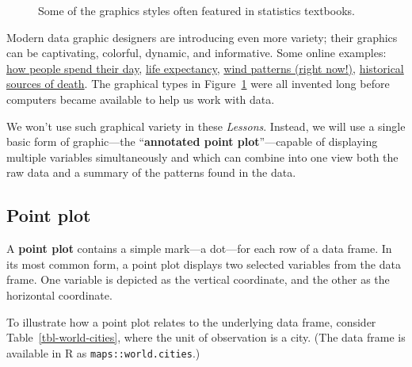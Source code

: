 \documentclass[
  letterpaper,
  DIV=11,
  numbers=noendperiod,
  oneside]{scrartcl}
\begin{document}
\begin{figure}
\begin{minipage}{0.25\linewidth}
\end{minipage}%

\caption{\label{fig-textbook-graphs}Some of the graphics styles often
featured in statistics textbooks.}

\end{figure}%

Modern data graphic designers are introducing even more variety; their
graphics can be captivating, colorful, dynamic, and informative. Some
online examples:
\href{https://flowingdata.com/2015/12/15/a-day-in-the-life-of-americans}{how
people spend their day},
\href{https://flowingdata.com/2017/01/24/one-dataset-visualized-25-ways}{life
expectancy}, \href{http://hint.fm/wind/}{wind patterns (right now!)},
\href{https://archive.nytimes.com/www.nytimes.com/imagepages/2011/11/06/opinion/06atrocities_timeline.html?action=click&contentCollection=Opinion&module=RelatedCoverage\%25C2\%25AEion=EndOfArticle&pgtype=article}{historical
sources of death}. The graphical types in
Figure~\ref{fig-textbook-graphs} were all invented long before computers
became available to help us work with data.

We won't use such graphical variety in these \emph{Lessons}.
{} Instead, we will use a single basic
form of graphic---the ``\textbf{annotated point plot}''---capable of
displaying multiple variables simultaneously and which can combine into
one view both the raw data and a summary of the patterns found in the
data.

\subsection{Point plot}\label{point-plot}

A \textbf{point plot} contains a simple mark---a dot---for each row of a
data frame. In its most common form, a point plot displays two selected
variables from the data frame. One variable is depicted as the vertical
coordinate, and the other as the horizontal coordinate.
{}

To illustrate how a point plot relates to the underlying data frame,
consider Table~\ref{tbl-world-cities}, where the unit of observation is
a city. (The data frame is available in R as
\texttt{maps::world.cities}.)
\end{document}
